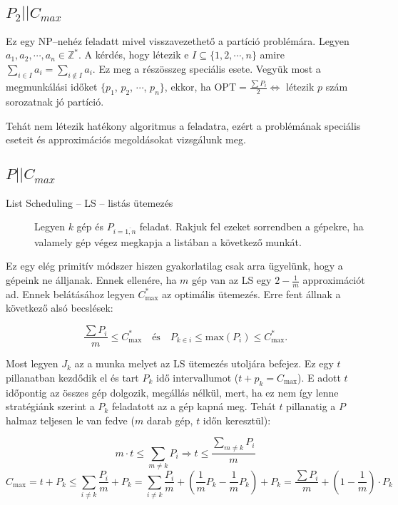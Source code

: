 \subsection{ \texorpdfstring {$ P_2||C_{max}$} {P2||Cmax} }

Ez egy NP--nehéz feladatt mivel visszavezethető a partíció problémára. Legyen
$a_1, a_2, \cdots, a_n \in \mathbb{Z}^*$. A kérdés, hogy létezik e $I \subseteq
\{1,2, \cdots, n \}$ amire $\sum_{i \in I} a_i = \sum_{i \not \in I} a_i$. Ez
meg a részösszeg speciális esete. Vegyük most a megmunkálási időket $\{p_1$, $p_2$,
$\cdots$, $p_n\}$, ekkor, ha OPT$=\frac{\sum P_i}{2} \Leftrightarrow$ létezik $p$
szám sorozatnak jó partíció. 

Tehát nem létezik hatékony algoritmus a feladatra, ezért a problémának speciális
eseteit és approximációs megoldásokat vizsgálunk meg.

\subsection{ \texorpdfstring {$ P||C_{max}$} {P||Cmax} }

\begin{description}
  \item[List Scheduling -- LS -- listás ütemezés] Legyen $k$ gép és
  $P_{i=\overline{1,n}}$ feladat. Rakjuk fel ezeket sorrendben a gépekre, ha
  valamely gép végez megkapja a listában a következő munkát.
\end{description}

Ez egy elég primitív módszer hiszen gyakorlatilag csak arra ügyelünk, hogy a
gépeink ne álljanak. Ennek ellenére, ha $m$ gép van  az LS egy $2 - \frac{1}{m}$
approximációt ad. Ennek belátásához legyen $C^*_{\mbox{max}}$ az optimális
ütemezés. Erre fent állnak a következő alsó becslések:

\[ \frac{\sum P_i}{m} \leq C^*_{\mbox{max}} ~~~\mbox{ és }~~~
   P_{k \in i} \leq \mbox{max} (P_i) \leq C^*_{\mbox{max}}. 
\]

Most legyen $J_k$ az a munka melyet az LS ütemezés utoljára befejez. Ez egy $t$
pillanatban kezdődik el és tart $P_k$ idő intervallumot ($t+p_k=C_{\mbox{max}}$).
E adott $t$ időpontig az összes gép dolgozik, megállás nélkül, mert, ha ez nem
így lenne stratégiánk szerint a $P_k$ feladatott az a gép kapná meg. Tehát $t$
pillanatig a $P$ halmaz teljesen le van fedve ($m$ darab gép, $t$ időn
keresztül):

\[ m \cdot t \leq \sum_{m \neq k}P_i \Rightarrow t \leq \frac{\sum\limits_{m \neq k}P_i}{m} 
\]
\[ C_{\mbox{max}}=t+P_k \leq \sum_{i \neq  k} \frac{P_i}{m} + P_k = \sum_{i \neq
 k} \frac{P_i}{m} + \left(\frac{1}{m} P_k - \frac{1}{m} P_k\right) + P_k 
 = \frac{\sum P_i}{m} + \left(1-\frac{1}{m}\right) \cdot P_k
\]

